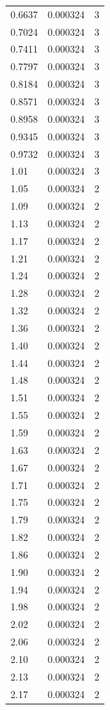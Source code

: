 \begin{longtable}{lrr}
  0.6637 & 0.000324 & 3 \\
  0.7024 & 0.000324 & 3 \\
  0.7411 & 0.000324 & 3 \\
  0.7797 & 0.000324 & 3 \\
  0.8184 & 0.000324 & 3 \\
  0.8571 & 0.000324 & 3 \\
  0.8958 & 0.000324 & 3 \\
  0.9345 & 0.000324 & 3 \\
  0.9732 & 0.000324 & 3 \\
  1.01 & 0.000324 & 3 \\
  1.05 & 0.000324 & 2 \\
  1.09 & 0.000324 & 2 \\
  1.13 & 0.000324 & 2 \\
  1.17 & 0.000324 & 2 \\
  1.21 & 0.000324 & 2 \\
  1.24 & 0.000324 & 2 \\
  1.28 & 0.000324 & 2 \\
  1.32 & 0.000324 & 2 \\
  1.36 & 0.000324 & 2 \\
  1.40 & 0.000324 & 2 \\
  1.44 & 0.000324 & 2 \\
  1.48 & 0.000324 & 2 \\
  1.51 & 0.000324 & 2 \\
  1.55 & 0.000324 & 2 \\
  1.59 & 0.000324 & 2 \\
  1.63 & 0.000324 & 2 \\
  1.67 & 0.000324 & 2 \\
  1.71 & 0.000324 & 2 \\
  1.75 & 0.000324 & 2 \\
  1.79 & 0.000324 & 2 \\
  1.82 & 0.000324 & 2 \\
  1.86 & 0.000324 & 2 \\
  1.90 & 0.000324 & 2 \\
  1.94 & 0.000324 & 2 \\
  1.98 & 0.000324 & 2 \\
  2.02 & 0.000324 & 2 \\
  2.06 & 0.000324 & 2 \\
  2.10 & 0.000324 & 2 \\
  2.13 & 0.000324 & 2 \\
  2.17 & 0.000324 & 2 \\

\end{longtable}
